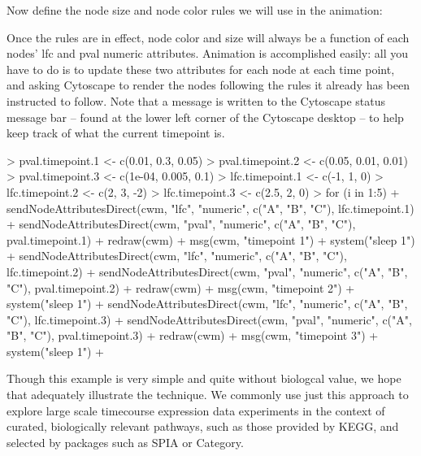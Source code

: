 \documentclass[12pt]{article}
\begin{document}
Now define the node size and node color rules we will use in the animation:

\begin{Schunk}
\end{Schunk}
Once the rules are in effect, node color and size will always be a function of each nodes' lfc and pval numeric attributes.  Animation is accomplished easily:  all you have to do is to update these two attributes for each node at each time point, and asking Cytoscape to render the nodes following the rules it already has been instructed to follow.  Note that a message is written to the Cytoscape status message bar -- found at the lower left corner of the Cytoscape desktop -- to help keep track of what the current timepoint is.
\begin{Schunk}
\begin{Sinput}
> pval.timepoint.1 <- c(0.01, 0.3, 0.05)
> pval.timepoint.2 <- c(0.05, 0.01, 0.01)
> pval.timepoint.3 <- c(1e-04, 0.005, 0.1)
> lfc.timepoint.1 <- c(-1, 1, 0)
> lfc.timepoint.2 <- c(2, 3, -2)
> lfc.timepoint.3 <- c(2.5, 2, 0)
> for (i in 1:5) {
+     sendNodeAttributesDirect(cwm, "lfc", "numeric", c("A", "B", "C"), lfc.timepoint.1)
+     sendNodeAttributesDirect(cwm, "pval", "numeric", c("A", "B", "C"), pval.timepoint.1)
+     redraw(cwm)
+     msg(cwm, "timepoint 1")
+     system("sleep 1")
+     sendNodeAttributesDirect(cwm, "lfc", "numeric", c("A", "B", "C"), lfc.timepoint.2)
+     sendNodeAttributesDirect(cwm, "pval", "numeric", c("A", "B", "C"), pval.timepoint.2)
+     redraw(cwm)
+     msg(cwm, "timepoint 2")
+     system("sleep 1")
+     sendNodeAttributesDirect(cwm, "lfc", "numeric", c("A", "B", "C"), lfc.timepoint.3)
+     sendNodeAttributesDirect(cwm, "pval", "numeric", c("A", "B", "C"), pval.timepoint.3)
+     redraw(cwm)
+     msg(cwm, "timepoint 3")
+     system("sleep 1")
+ }
\end{Sinput}
\end{Schunk}
Though this example is very simple and quite without biologcal value, we hope that adequately illustrate the technique.  We commonly use just this approach to explore large scale timecourse expression data experiments in the context of curated, biologically relevant pathways, such as those provided by KEGG, and selected by packages such as SPIA or Category.
\end{document}
